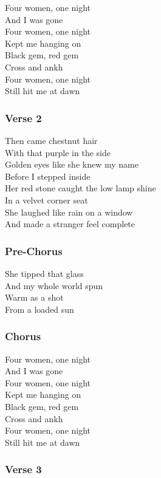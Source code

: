 Four women, one night\\
And I was gone\\
Four women, one night\\
Kept me hanging on\\
Black gem, red gem\\
Cross and ankh\\
Four women, one night\\
Still hit me at dawn

\subsubsection{Verse 2}\label{verse-2-2}

Then came chestnut hair\\
With that purple in the side\\
Golden eyes like she knew my name\\
Before I stepped inside\\
Her red stone caught the low lamp shine\\
In a velvet corner seat\\
She laughed like rain on a window\\
And made a stranger feel complete

\subsubsection{Pre-Chorus}\label{pre-chorus-1}

She tipped that glass\\
And my whole world spun\\
Warm as a shot\\
From a loaded sun

\subsubsection{Chorus}\label{chorus-8}

Four women, one night\\
And I was gone\\
Four women, one night\\
Kept me hanging on\\
Black gem, red gem\\
Cross and ankh\\
Four women, one night\\
Still hit me at dawn

\subsubsection{Verse 3}\label{verse-3-2}

